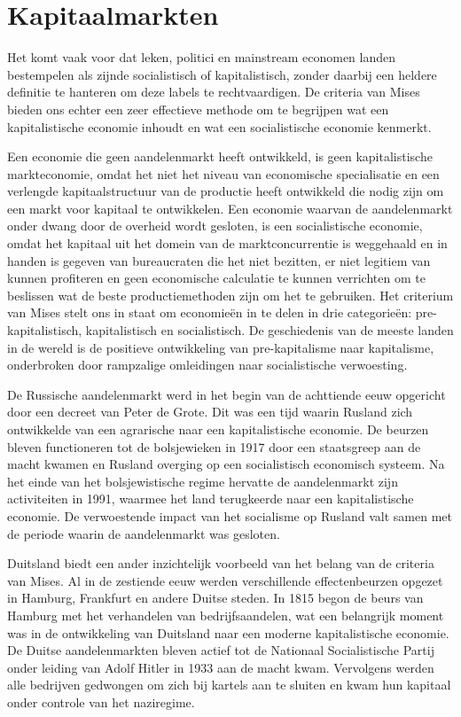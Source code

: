 \documentclass[
  a5paper,
  smalldemyvopaper,11pt,twoside,onecolumn,openright,extrafontsizes,
hidelinks]{memoir}
\begin{document}
\section{Kapitaalmarkten}\label{kapitaalmarkten}

Het komt vaak voor dat leken, politici en mainstream economen landen
bestempelen als zijnde socialistisch of kapitalistisch, zonder daarbij
een heldere definitie te hanteren om deze labels te rechtvaardigen. De
criteria van Mises bieden ons echter een zeer effectieve methode om te
begrijpen wat een kapitalistische economie inhoudt en wat een
socialistische economie kenmerkt.

Een economie die geen aandelenmarkt heeft ontwikkeld, is geen
kapitalistische markteconomie, omdat het niet het niveau van economische
specialisatie en een verlengde kapitaalstructuur van de productie heeft
ontwikkeld die nodig zijn om een markt voor kapitaal te ontwikkelen. Een
economie waarvan de aandelenmarkt onder dwang door de overheid wordt
gesloten, is een socialistische economie, omdat het kapitaal uit het
domein van de marktconcurrentie is weggehaald en in handen is gegeven
van bureaucraten die het niet bezitten, er niet legitiem van kunnen
profiteren en geen economische calculatie te kunnen verrichten om te
beslissen wat de beste productiemethoden zijn om het te gebruiken. Het
criterium van Mises stelt ons in staat om economieën in te delen in drie
categorieën: pre-kapitalistisch, kapitalistisch en socialistisch. De
geschiedenis van de meeste landen in de wereld is de positieve
ontwikkeling van pre-kapitalisme naar kapitalisme, onderbroken door
rampzalige omleidingen naar socialistische verwoesting.

De Russische aandelenmarkt werd in het begin van de achttiende eeuw
opgericht door een decreet van Peter de Grote. Dit was een tijd waarin
Rusland zich ontwikkelde van een agrarische naar een kapitalistische
economie. De beurzen bleven functioneren tot de bolsjewieken in 1917
door een staatsgreep aan de macht kwamen en Rusland overging op een
socialistisch economisch systeem. Na het einde van het bolsjewistische
regime hervatte de aandelenmarkt zijn activiteiten in 1991, waarmee het
land terugkeerde naar een kapitalistische economie. De verwoestende
impact van het socialisme op Rusland valt samen met de periode waarin de
aandelenmarkt was gesloten.

Duitsland biedt een ander inzichtelijk voorbeeld van het belang van de
criteria van Mises. Al in de zestiende eeuw werden verschillende
effectenbeurzen opgezet in Hamburg, Frankfurt en andere Duitse steden.
In 1815 begon de beurs van Hamburg met het verhandelen van
bedrijfsaandelen, wat een belangrijk moment was in de ontwikkeling van
Duitsland naar een moderne kapitalistische economie. De Duitse
aandelenmarkten bleven actief tot de Nationaal Socialistische Partij
onder leiding van Adolf Hitler in 1933 aan de macht kwam. Vervolgens
werden alle bedrijven gedwongen om zich bij kartels aan te sluiten en
kwam hun kapitaal onder controle van het naziregime.
\end{document}
